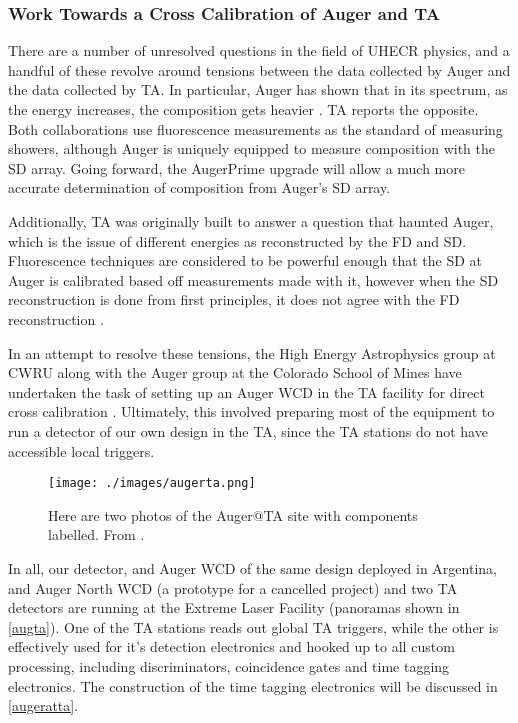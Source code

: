 \subsubsection{Work Towards a Cross Calibration of Auger and TA}
\label{augertamotiv}
There are a number of unresolved questions in the field of UHECR physics, and a handful of these revolve around tensions between the data collected by Auger and the data collected by TA. In particular, Auger has shown that in its spectrum, as the energy increases, the composition gets heavier \cite{heavycomp}. TA reports the opposite. Both collaborations use fluorescence measurements as the standard of measuring showers, although Auger is uniquely equipped to measure composition with the SD array. Going forward, the AugerPrime upgrade will allow a much more accurate determination of composition from Auger's SD array.

Additionally, TA was originally built to answer a question that haunted Auger, which is the issue of different energies as reconstructed by the FD and SD. Fluorescence techniques are considered to be powerful enough that the SD at Auger is calibrated based off measurements made with it, however when the SD reconstruction is done from first principles, it does not agree with the FD reconstruction \cite{tale}.

In an attempt to resolve these tensions, the High Energy Astrophysics group at CWRU along with the Auger group at the Colorado School of Mines have undertaken the task of setting up an Auger WCD in the TA facility for direct cross calibration \cite{sean}. Ultimately, this involved preparing most of the equipment to run a detector of our own design in the TA, since the TA stations do not have accessible local triggers. 


\begin{figure}[h!]
\begin{center}
\texttt{[image: ./images/augerta.png]}
\caption[Auger@TA Setup]{Here are two photos of the Auger@TA site with components labelled. From \textcite{sean}.}
\label{augta}
\end{center}
\end{figure}

In all, our detector, and Auger WCD of the same design deployed in Argentina, and Auger North WCD (a prototype for a cancelled project) and two TA detectors are running at the Extreme Laser Facility (panoramas shown in \autoref{augta}). One of the TA stations reads out global TA triggers, while the other is effectively used for it's detection electronics and hooked up to all custom processing, including discriminators, coincidence gates and time tagging electronics. The construction of the time tagging electronics will be discussed in \autoref{augeratta}.
